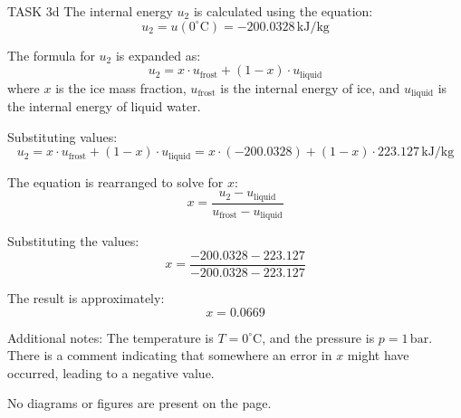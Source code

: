 TASK 3d  
The internal energy \( u_2 \) is calculated using the equation:  
\[
u_2 = u(0^\circ\text{C}) = -200.0328 \, \text{kJ/kg}
\]  

The formula for \( u_2 \) is expanded as:  
\[
u_2 = x \cdot u_{\text{frost}} + (1 - x) \cdot u_{\text{liquid}}
\]  
where \( x \) is the ice mass fraction, \( u_{\text{frost}} \) is the internal energy of ice, and \( u_{\text{liquid}} \) is the internal energy of liquid water.  

Substituting values:  
\[
u_2 = x \cdot u_{\text{frost}} + (1 - x) \cdot u_{\text{liquid}} = x \cdot (-200.0328) + (1 - x) \cdot 223.127 \, \text{kJ/kg}
\]  

The equation is rearranged to solve for \( x \):  
\[
x = \frac{u_2 - u_{\text{liquid}}}{u_{\text{frost}} - u_{\text{liquid}}}
\]  

Substituting the values:  
\[
x = \frac{-200.0328 - 223.127}{-200.0328 - 223.127}
\]  

The result is approximately:  
\[
x = 0.0669
\]  

Additional notes:  
The temperature is \( T = 0^\circ\text{C} \), and the pressure is \( p = 1 \, \text{bar} \). There is a comment indicating that somewhere an error in \( x \) might have occurred, leading to a negative value.  

No diagrams or figures are present on the page.